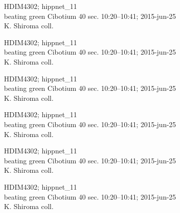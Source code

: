 \documentclass[2pt]{extarticle}
\begin{document}
\noindent
\parbox{0.16\textwidth}{\tiny \raggedright \rule[-0.3\baselineskip]{0pt}{10pt}HDIM4302; hippnet\_11\\ beating green Cibotium 40 sec. 10:20--10:41; 2015-jun-25\\ K. Shiroma coll.}
\parbox{0.16\textwidth}{\tiny \raggedright \rule[-0.3\baselineskip]{0pt}{10pt}HDIM4302; hippnet\_11\\ beating green Cibotium 40 sec. 10:20--10:41; 2015-jun-25\\ K. Shiroma coll.}
\parbox{0.16\textwidth}{\tiny \raggedright \rule[-0.3\baselineskip]{0pt}{10pt}HDIM4302; hippnet\_11\\ beating green Cibotium 40 sec. 10:20--10:41; 2015-jun-25\\ K. Shiroma coll.}
\parbox{0.16\textwidth}{\tiny \raggedright \rule[-0.3\baselineskip]{0pt}{10pt}HDIM4302; hippnet\_11\\ beating green Cibotium 40 sec. 10:20--10:41; 2015-jun-25\\ K. Shiroma coll.}
\parbox{0.16\textwidth}{\tiny \raggedright \rule[-0.3\baselineskip]{0pt}{10pt}HDIM4302; hippnet\_11\\ beating green Cibotium 40 sec. 10:20--10:41; 2015-jun-25\\ K. Shiroma coll.}
\parbox{0.16\textwidth}{\tiny \raggedright \rule[-0.3\baselineskip]{0pt}{10pt}HDIM4302; hippnet\_11\\ beating green Cibotium 40 sec. 10:20--10:41; 2015-jun-25\\ K. Shiroma coll.} \\ 
\vspace{0.001in} 
\end{document}
